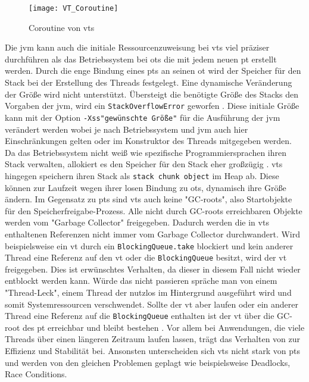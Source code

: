     \begin{figure}[H]
        \centering
        \texttt{[image: VT\_Coroutine]}
        \caption{Coroutine von \Glspl{vt}}
        \label{fig:VT_Coroutine}
    \end{figure}

    Die \gls{jvm} kann auch die initiale Ressourcenzuweisung bei \Glspl{vt} viel präziser durchführen als das Betriebssystem bei \Glspl{ot} die mit jedem neuen \gls{pt}
    erstellt werden. Durch die enge Bindung eines \Glspl{pt} an seinen \gls{ot} wird der Speicher für den Stack bei der Erstellung des Threads festgelegt.
    Eine dynamische Veränderung der Größe wird nicht unterstützt. Übersteigt die benötigte Größe des Stacks den Vorgaben der \gls{jvm}, wird ein \texttt{StackOverflowError}
    geworfen \cite{jvmSpecification}. Diese initiale Größe kann mit der Option \texttt{-Xss"gewünschte Größe"} für die Ausführung der \gls{jvm} verändert werden wobei 
    je nach Betriebssystem und \gls{jvm} auch hier Einschränkungen gelten oder im Konstruktor des Threads mitgegeben werden.
    Da das Betriebssystem nicht weiß wie spezifische Programmiersprachen ihren Stack verwalten, allokiert
    es den Speicher für den Stack eher großzügig \cite{ProjectLoom}.
    \Glspl{vt} hingegen speichern ihren Stack als \texttt{stack chunk object} im Heap ab. Diese können zur Laufzeit wegen ihrer losen Bindung zu \Glspl{ot},
    dynamisch ihre Größe ändern. 
    Im Gegensatz zu \Glspl{pt} sind \Glspl{vt} auch keine "GC-roots", also Startobjekte für den Speicherfreigabe-Prozess. Alle nicht durch GC-roots erreichbaren
    Objekte werden vom "Garbage Collector" freigegeben. Dadurch werden die in \Glspl{vt} enthaltenen
    Referenzen nicht immer vom Garbage Collector durchwandert. Wird beispielsweise ein \gls{vt} durch ein \texttt{BlockingQueue.take} blockiert und kein anderer Thread eine
    Referenz auf den \gls{vt} oder die \texttt{BlockingQueue} besitzt, wird der \gls{vt} freigegeben. Dies ist erwünschtes Verhalten, da dieser in diesem Fall 
    nicht wieder entblockt werden kann. Würde das nicht passieren spräche man von einem "Thread-Leck", einem Thread der nutzlos im Hintergrund ausgeführt wird und somit
    Systemressourcen verschwendet. 
    Sollte der \gls{vt} aber laufen oder ein anderer Thread eine Referenz auf die \texttt{BlockingQueue} enthalten ist der 
    \gls{vt} über die GC-root des \gls{pt} erreichbar und bleibt bestehen \cite{JEP425}.
    Vor allem bei Anwendungen, die viele Threads über einen längeren Zeitraum  laufen lassen, trägt das Verhalten von  zur Effizienz und Stabilität bei.
    Ansonsten unterscheiden sich \Glspl{vt} nicht stark von \Glspl{pt} und werden von den gleichen Problemen geplagt wie beispielsweise Deadlocks, Race Conditions\cite{JEP425}.

